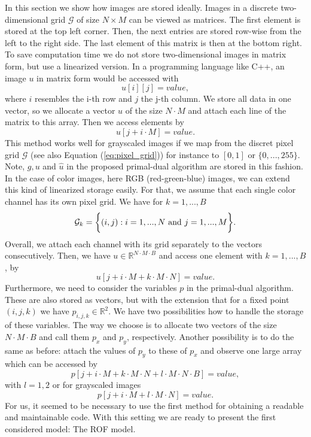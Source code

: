 \documentclass[abstracton]{scrreprt}
\begin{document}
        In this section we show how images are stored ideally. Images in a discrete two-dimensional grid $\mathcal{G}$ of size $N \times M$ can be viewed as matrices. The first element is stored at the top left corner. Then, the next entries are stored row-wise from the left to the right side. The last element of this matrix is then at the bottom right. To save computation time we do not store two-dimensional images in matrix form, but use a linearized version. In a programming language like C++, an image $u$ in matrix form would be accessed with
            $$
                u[i][j] = value,
            $$
        where $i$ resembles the i-th row and $j$ the j-th column. We store all data in one vector, so we allocate a vector $u$ of the size $N \cdot M$ and attach each line of the matrix to this array. Then we access elements by
            $$
                u[j + i \cdot M] = value.
            $$
        This method works well for grayscaled images if we map from the discret pixel grid $\mathcal{G}$ (see also Equation (\ref{eq:pixel_grid})) for instance to $[0, 1]$ or $\{ 0, ..., 255 \}$. Note, $g, u$ and $\hat{u}$ in the proposed primal-dual algorithm are stored in this fashion. In the case of color images, here RGB (red-green-blue) images, we can extend this kind of linearized storage easily. For that, we assume that each single color channel has its own pixel grid. We have for $k = 1, ..., B$
            \begin{equation}
                \mathcal{G}_{k} = \bigg\{ (i, j) : i = 1, ..., N \,\, \textnormal{and} \,\, j = 1, ..., M \bigg\}.
                \label{eq:color_pixel_grid}
            \end{equation}
        Overall, we attach each channel with its grid separately to the vectors consecutively. Then, we have $u \in \mathbb{R}^{N \cdot M \cdot B}$ and access one element with $k = 1, ..., B$, by
            $$
                u[j + i \cdot M + k \cdot M \cdot N] = value.
            $$
        Furthermore, we need to consider the variables $p$ in the primal-dual algorithm. These are also stored as vectors, but with the extension that for a fixed point $(i, j, k)$ we have $p_{i,j,k} \in \mathbb{R}^{2}$. We have two possibilities how to handle the storage of these variables. The way we choose is to allocate two vectors of the size $N \cdot M \cdot B$ and call them $p_{x}$ and $p_{y}$, respectively.
        Another possibility is to do the same as before: attach the values of $p_{y}$ to these of $p_{x}$ and observe one large array which can be accessed by
            $$
                p[j + i \cdot M + k \cdot M \cdot N + l \cdot M \cdot N \cdot B] = value,
            $$
        with $l = 1, 2$ or for grayscaled images
            $$
                p[j + i \cdot M + l \cdot M \cdot N] = value.
            $$
        For us, it seemed to be necessary to use the first method for obtaining a readable and maintainable code. With this setting we are ready to present the first considered model: The ROF model.
\end{document}
